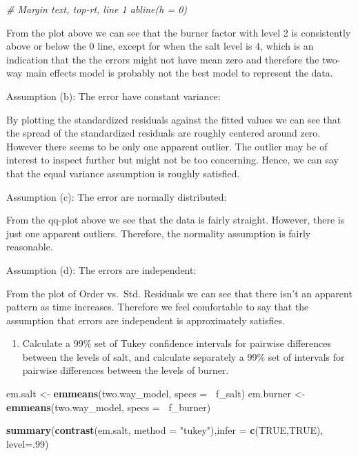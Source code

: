 \documentclass[12pt,]{article}
\newenvironment{Shaded}{\begin{snugshade}}{\end{snugshade}}
\newcommand{\KeywordTok}[1]{\textcolor[rgb]{0.13,0.29,0.53}{\textbf{#1}}}
\newcommand{\DataTypeTok}[1]{\textcolor[rgb]{0.13,0.29,0.53}{#1}}
\newcommand{\DecValTok}[1]{\textcolor[rgb]{0.00,0.00,0.81}{#1}}
\newcommand{\StringTok}[1]{\textcolor[rgb]{0.31,0.60,0.02}{#1}}
\newcommand{\CommentTok}[1]{\textcolor[rgb]{0.56,0.35,0.01}{\textit{#1}}}
\newcommand{\OtherTok}[1]{\textcolor[rgb]{0.56,0.35,0.01}{#1}}
\newcommand{\OperatorTok}[1]{\textcolor[rgb]{0.81,0.36,0.00}{\textbf{#1}}}
\newcommand{\NormalTok}[1]{#1}
\providecommand{\tightlist}{%
  \setlength{\itemsep}{0pt}\setlength{\parskip}{0pt}}
\begin{document}
\begin{Shaded}
\begin{Highlighting}[]
 \CommentTok{# Margin text, top-rt, line 1 abline(h = 0)}
\end{Highlighting}
\end{Shaded}

From the plot above we can see that the burner factor with level 2 is
consistently above or below the 0 line, except for when the salt level
is 4, which is an indication that the the errors might not have mean
zero and therefore the two-way main effects model is probably not the
best model to represent the data.

Assumption (b): The error have constant variance:

By plotting the standardized residuals against the fitted values we can
see that the spread of the standardized residuals are roughly centered
around zero. However there seems to be only one apparent outlier. The
outlier may be of interest to inspect further but might not be too
concerning. Hence, we can say that the equal variance assumption is
roughly satisfied.

Assumption (c): The error are normally distributed:

From the qq-plot above we see that the data is fairly straight. However,
there is just one apparent outliers. Therefore, the normality assumption
is fairly reasonable.

Assumption (d): The errors are independent:

From the plot of Order vs.~Std. Residuals we can see that there isn't an
apparent pattern as time increases. Therefore we feel comfortable to say
that the assumption that errors are independent is approximately
satisfies.

\begin{enumerate}
\def\labelenumi{(\alph{enumi})}
\setcounter{enumi}{1}
\tightlist
\item
  Calculate a 99\% set of Tukey confidence intervals for pairwise
  differences between the levels of salt, and calculate separately a
  99\% set of intervals for pairwise differences between the levels of
  burner.
\end{enumerate}

\begin{Shaded}
\begin{Highlighting}[]
\NormalTok{em.salt <-}\StringTok{ }\KeywordTok{emmeans}\NormalTok{(two.way_model, }\DataTypeTok{specs =} \OperatorTok{~}\NormalTok{f_salt)}
\NormalTok{em.burner <-}\StringTok{ }\KeywordTok{emmeans}\NormalTok{(two.way_model, }\DataTypeTok{specs =} \OperatorTok{~}\NormalTok{f_burner)}

\KeywordTok{summary}\NormalTok{(}\KeywordTok{contrast}\NormalTok{(em.salt, }\DataTypeTok{method =} \StringTok{"tukey"}\NormalTok{),}\DataTypeTok{infer =} \KeywordTok{c}\NormalTok{(}\OtherTok{TRUE}\NormalTok{,}\OtherTok{TRUE}\NormalTok{), }\DataTypeTok{level=}\NormalTok{.}\DecValTok{99}\NormalTok{)}
\end{Highlighting}
\end{Shaded}
\end{document}

